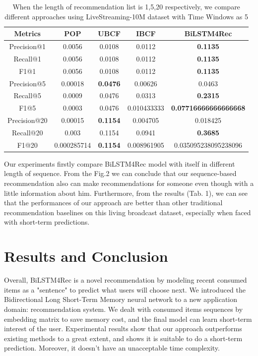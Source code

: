 \documentclass[runningheads]{llncs}
\begin{document}
\begin{table}[htbp]
\begin{center}
\begin{tabular}{|c|c|c|c|c|}
\hline

\textbf{Metrics} & \textbf{POP}& \textbf{UBCF}& \textbf{IBCF}& \textbf{BiLSTM4Rec} \\
\hline
Precision@1& 0.0056& 0.0108 & 0.0112 & \textbf{0.1135} \\
\hline
Recall@1& 0.0056& 0.0108 & 0.0112 & \textbf{0.1135}\\
\hline
F1@1& 0.0056& 0.0108 & 0.0112 & \textbf{0.1135}\\
\hline
Precision@5& 0.00018& \textbf{0.0476} & 0.00626 & 0.0463\\
\hline
Recall@5& 0.0009& 0.0476 & 0.0313 & \textbf{0.2315}\\
\hline
F1@5& 0.0003& 0.0476 & 0.010433333 & \textbf{0.07716666666666668}\\
\hline
Precision@20& 0.00015& \textbf{0.1154} & 0.004705 & 0.018425\\
\hline
Recall@20& 0.003& 0.1154 & 0.0941 & \textbf{0.3685}\\
\hline
F1@20& 0.000285714& \textbf{0.1154} & 0.008961905 & 0.035095238095238096\\
\hline
\end{tabular}
\label{tab1}
\end{center}
\caption{When the length of recommendation list is 1,5,20 respectively, we compare different approaches using LiveStreaming-10M dataset with Time Windows as 5}
\end{table}
Our experiments firstly compare BiLSTM4Rec model with itself in different length of sequence. From the Fig.2 we can conclude that our sequence-based recommendation also can make recommendations for someone even though with a little information about him. Furthermore, from the results (Tab. 1), we can see that the performances of our approach are better than other traditional recommendation baselines on this living broadcast dataset, especially when faced with short-term predictions.

\section{Results and Conclusion}

Overall, BiLSTM4Rec is a novel recommendation by modeling recent consumed items as a "sentence" to predict what users will choose next. We introduced the Bidirectional Long Short-Term Memory neural network to a new application domain: recommendation system. We dealt with consumed items sequences by embedding matrix to save memory cost, and the final model can learn short-term interest of the user. Experimental results show that our approach outperforms existing methods to a great extent, and shows it is suitable to do a short-term prediction. Moreover, it doesn't have an unacceptable time complexity.
\end{document}
